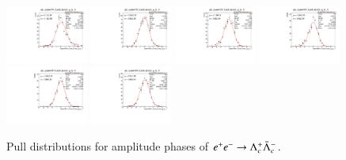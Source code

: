 \begin{figure}[h]
    \includegraphics[width=0.24\textwidth]{figure/io_wo_bkg/gls/pull_gls_epem4740_Lmdc.aLmdc_g_ls_1i.pdf}
    \includegraphics[width=0.24\textwidth]{figure/io_wo_bkg/gls/pull_gls_epem4750_Lmdc.aLmdc_g_ls_1i.pdf}
    \includegraphics[width=0.24\textwidth]{figure/io_wo_bkg/gls/pull_gls_epem4780_Lmdc.aLmdc_g_ls_1i.pdf}
    \includegraphics[width=0.24\textwidth]{figure/io_wo_bkg/gls/pull_gls_epem4840_Lmdc.aLmdc_g_ls_1i.pdf}
    \includegraphics[width=0.24\textwidth]{figure/io_wo_bkg/gls/pull_gls_epem4914_Lmdc.aLmdc_g_ls_1i.pdf}
    \includegraphics[width=0.24\textwidth]{figure/io_wo_bkg/gls/pull_gls_epem4946_Lmdc.aLmdc_g_ls_1i.pdf}
    \caption{Pull distributions for amplitude phases of $e^+e^-\rightarrow\Lambda_{c}^{+}\bar{\Lambda}_{c}^{-}$.}
\label{fig:io_wo_bkg_pull_phase}
\end{figure}

